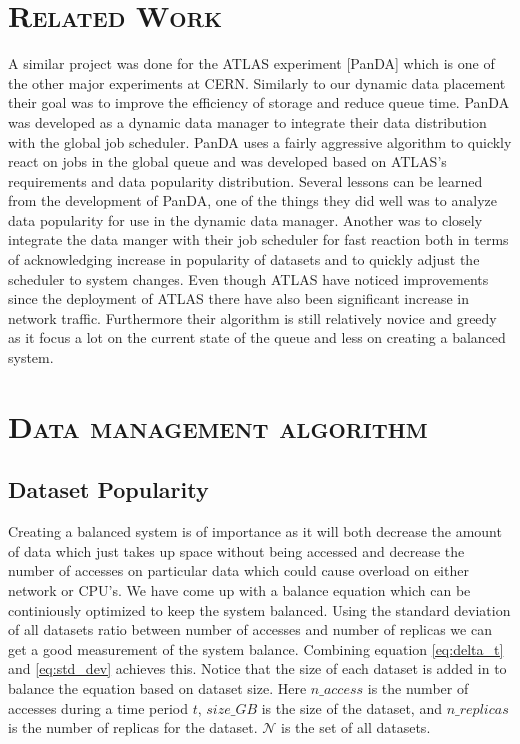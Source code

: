 \documentclass[11pt,a4page]{article}
\begin{document}
\section{\textsc{Related Work}}

A similar project was done for the ATLAS experiment [PanDA] which is one of the other major experiments at CERN. Similarly to our dynamic data placement their goal was to improve the efficiency of storage and reduce queue time. PanDA was developed as a dynamic data manager to integrate their data distribution with the global job scheduler. PanDA uses a fairly aggressive algorithm to quickly react on jobs in the global queue and was developed based on ATLAS's requirements and data popularity distribution. Several lessons can be learned from the development of PanDA, one of the things they did well was to analyze data popularity for use in the dynamic data manager. Another was to closely integrate the data manger with their job scheduler for fast reaction both in terms of acknowledging increase in popularity of datasets and to quickly adjust the scheduler to system changes. Even though ATLAS have noticed improvements since the deployment of ATLAS there have also been significant increase in network traffic. Furthermore their algorithm is still relatively novice and greedy as it focus a lot on the current state of the queue and less on creating a balanced system.


\section{\textsc{Data management algorithm}}

  \subsection{Dataset Popularity}
    Creating a balanced system is of importance as it will both decrease the amount of data which just takes up space without being accessed and decrease the number of accesses on particular data which could cause overload on either network or CPU's. We have come up with a balance equation which can be continiously optimized to keep the system balanced. Using the standard deviation of all datasets ratio between number of accesses and number of replicas we can get a good measurement of the system balance. Combining equation \ref{eq:delta_t} and \ref{eq:std_dev} achieves this. Notice that the size of each dataset is added in to balance the equation based on dataset size. Here $n\_access$ is the number of accesses during a time period $t$, $size\_GB$ is the size of the dataset, and $n\_replicas$ is the number of replicas for the dataset. $\mathcal{N}$ is the set of all datasets.
\end{document}
